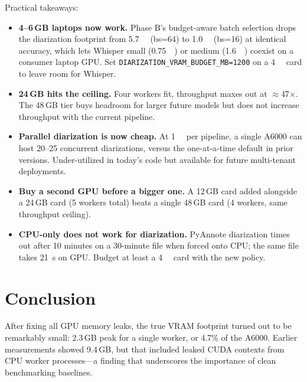 \documentclass[conference,10pt]{IEEEtran}
\begin{document}
Practical takeaways:
\begin{itemize}[nosep,leftmargin=*]
  \item \textbf{4--6\,GB laptops now work.} Phase B's budget-aware batch
    selection drops the diarization footprint from \SI{5.7}{\giga\byte}
    (bs=64) to \SI{1.0}{\giga\byte} (bs=16) at identical accuracy, which
    lets Whisper small (\SI{0.75}{\giga\byte}) or medium
    (\SI{1.6}{\giga\byte}) coexist on a consumer laptop GPU. Set
    \texttt{DIARIZATION\_VRAM\_BUDGET\_MB=1200} on a \SI{4}{\giga\byte}
    card to leave room for Whisper.
  \item \textbf{24\,GB hits the ceiling.} Four workers fit, throughput maxes
    out at $\approx$47$\times$. The 48\,GB tier buys headroom for larger future
    models but does not increase throughput with the current pipeline.
  \item \textbf{Parallel diarization is now cheap.} At \SI{1}{\giga\byte}
    per pipeline, a single A6000 can host \SIrange{20}{25}{}
    concurrent diarizations, versus the one-at-a-time default in prior
    versions. Under-utilized in today's code but available for future
    multi-tenant deployments.
  \item \textbf{Buy a second GPU before a bigger one.} A 12\,GB card added
    alongside a 24\,GB card (5 workers total) beats a single 48\,GB card
    (4 workers, same throughput ceiling).
  \item \textbf{CPU-only does not work for diarization.} PyAnnote diarization
    times out after 10 minutes on a 30-minute file when forced onto CPU;
    the same file takes \SI{21}{\second} on GPU. Budget at least a
    \SI{4}{\giga\byte} card with the new policy.
\end{itemize}

\section{Conclusion}

After fixing all GPU memory leaks, the true VRAM footprint turned out to be
remarkably small: 2.3\,GB peak for a single worker, or 4.7\% of the A6000.
Earlier measurements showed 9.4\,GB, but that included leaked CUDA contexts
from CPU worker processes---a finding that underscores the importance of clean
benchmarking baselines.
\end{document}
